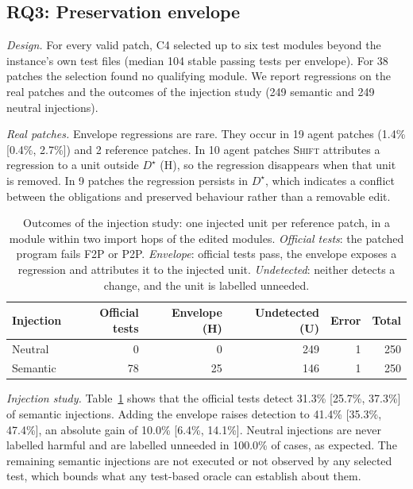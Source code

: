 \documentclass[a4paper,fleqn]{cas-sc}
\newcommand{\tool}{\textsc{Shift}}
\newcommand{\lab}[1]{\textsf{#1}}
\newcommand{\rqthreeAgentHarmful}{10}
\newcommand{\rqthreeAgentRegCI}{[0.4\%, 2.7\%]}
\newcommand{\rqthreeAgentRegMinimal}{9}
\newcommand{\rqthreeAgentRegN}{19}
\newcommand{\rqthreeAgentRegRate}{1.4\%}
\newcommand{\rqthreeEnvEmpty}{38}
\newcommand{\rqthreeEnvTestsMedian}{104}
\newcommand{\rqthreeGoldRegN}{2}
\newcommand{\rqthreeNeutralLabelledU}{100.0\%}
\newcommand{\rqthreeNeutralN}{249}
\newcommand{\rqthreeSemanticEnvelope}{41.4\% [35.3\%, 47.4\%]}
\newcommand{\rqthreeSemanticGain}{10.0\% [6.4\%, 14.1\%]}
\newcommand{\rqthreeSemanticN}{249}
\newcommand{\rqthreeSemanticOfficial}{31.3\% [25.7\%, 37.3\%]}
\begin{document}
\subsection{RQ3: Preservation envelope}\label{sec:rq3}
\emph{Design.} For every valid patch, C4 selected up to six test modules beyond the instance's own test files (median \rqthreeEnvTestsMedian{} stable passing tests per envelope). For \rqthreeEnvEmpty{} patches the selection found no qualifying module. We report regressions on the real patches and the outcomes of the injection study (\rqthreeSemanticN{} semantic and \rqthreeNeutralN{} neutral injections).

\emph{Real patches.} Envelope regressions are rare. They occur in \rqthreeAgentRegN{} agent patches (\rqthreeAgentRegRate{} \rqthreeAgentRegCI{}) and \rqthreeGoldRegN{} reference patches. In \rqthreeAgentHarmful{} agent patches \tool{} attributes a regression to a unit outside $D^\star$ (\lab{H}), so the regression disappears when that unit is removed. In \rqthreeAgentRegMinimal{} patches the regression persists in $D^\star$, which indicates a conflict between the obligations and preserved behaviour rather than a removable edit.

\begin{table}[t]
\caption{Outcomes of the injection study: one injected unit per reference patch, in a module within two import hops of the edited modules. \emph{Official tests}: the patched program fails F2P or P2P. \emph{Envelope}: official tests pass, the envelope exposes a regression and attributes it to the injected unit. \emph{Undetected}: neither detects a change, and the unit is labelled unneeded.}
\label{tab:injection}
\centering\footnotesize
\begin{tabular}{lrrrrr}
\toprule
Injection & Official tests & Envelope (\lab{H}) & Undetected (\lab{U}) & Error & Total \\
\midrule
Neutral & 0 & 0 & 249 & 1 & 250 \\
Semantic & 78 & 25 & 146 & 1 & 250 \\
\bottomrule
\end{tabular}
\end{table}

\emph{Injection study.} Table~\ref{tab:injection} shows that the official tests detect \rqthreeSemanticOfficial{} of semantic injections. Adding the envelope raises detection to \rqthreeSemanticEnvelope{}, an absolute gain of \rqthreeSemanticGain{}. Neutral injections are never labelled harmful and are labelled unneeded in \rqthreeNeutralLabelledU{} of cases, as expected. The remaining semantic injections are not executed or not observed by any selected test, which bounds what any test-based oracle can establish about them.
\end{document}
